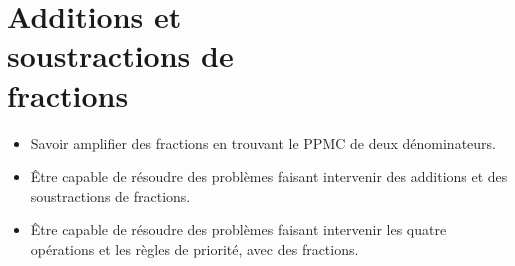 \chapter{Additions et\\soustractions de\\fractions}\label{ChAddSousFrac}


\vspace{5cm}
\begin{acquis}
\begin{itemize}
\item Savoir amplifier des fractions en trouvant le PPMC de deux dénominateurs.
\item Être capable de résoudre des problèmes faisant intervenir des additions et des soustractions de fractions.
\item Être capable de résoudre des problèmes faisant intervenir les quatre opérations et les règles de priorité, avec des fractions.
\end{itemize}
\end{acquis}


\activites  


\cours


\exercicesbase
\begin{colonne*exercice}

\end{colonne*exercice}


%

\connaissances
%

%

\Recreation %
%


